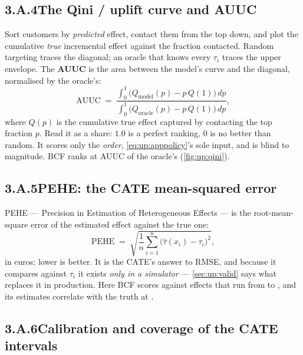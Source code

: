 \subsection*{3.A.4\quad The Qini / uplift curve and AUUC}

Sort customers by \emph{predicted} effect, contact them from the top down, and plot the cumulative
\emph{true} incremental effect against the fraction contacted. Random targeting traces the diagonal;
an oracle that knows every $\tau_i$ traces the upper envelope. The \textbf{AUUC} is the area between
the model's curve and the diagonal, normalised by the oracle's:
%
\begin{equation}
  \text{AUUC}
  \;=\; \frac{\int_0^1 \big(Q_{\text{model}}(p) - p\,Q(1)\big)\,dp}
             {\int_0^1 \big(Q_{\text{oracle}}(p) - p\,Q(1)\big)\,dp},
  \label{eq:up:appqini}
\end{equation}
%
where $Q(p)$ is the cumulative true effect captured by contacting the top fraction $p$. Read it as a
share: $1.0$ is a perfect ranking, $0$ is no better than random. It scores only the \emph{order},
\cref{eq:up:apppolicy}'s sole input, and is blind to magnitude. BCF ranks at AUUC \nbOneBcfAuuc{} of
the oracle's (\cref{fig:up:qini}).

\subsection*{3.A.5\quad PEHE: the CATE mean-squared error}

PEHE --- Precision in Estimation of Heterogeneous Effects --- is the root-mean-square error of the
estimated effect against the true one:
%
\begin{equation}
  \text{PEHE} \;=\; \sqrt{\frac1n \sum_{i=1}^{n}\big(\hat\tau(x_i) - \tau_i\big)^2},
  \label{eq:up:apppehe}
\end{equation}
%
in euros; lower is better. It is the CATE's answer to RMSE, and because it compares against $\tau_i$ it
exists \emph{only in a simulator} --- \cref{sec:up:valid} says what replaces it in production. Here BCF
scores \eur{\nbOneBcfPehe} against effects that run from \eur{\nbOneTauLo} to \eur{\nbOneTauHi}, and its
estimates correlate with the truth at \nbOneBcfCorr.

\subsection*{3.A.6\quad Calibration and coverage of the CATE intervals}

